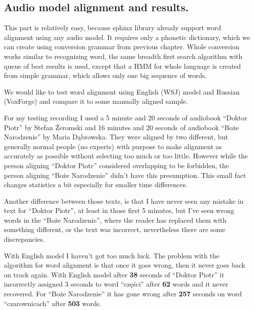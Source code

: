 \documentclass[12pt,a4paper,english]{article}
\begin{document}
\newpage
\subsection{Audio model alignment and results.}

This part is relatively easy, because sphinx library already support word alignment using any audio model. It requires only a phonetic dictionary, which we can create using conversion grammar from previous chapter.  Whole conversion works similar to recognizing word, the same breadth first search algorithm with queue of best results is used, except that a HMM for whole language is created from simple grammar, which allows only one big sequence of words. \newline

We would like to test word alignment using English (WSJ) model and Russian (VoxForge) and compare it to some manually aligned sample. \newline

For my testing recording I used a 5 minute and 20 seconds of audiobook “Doktor Piotr” by Stefan Żeromski and 16 minutes and 20 seconds of audiobook “Boże Narodzenie” by Maria Dąbrowska. \newline
They were aligned by two different, but generally normal people (no experts) with purpose to make alignment as accurately as possible without selecting too much or too little. However while the person aligning “Doktor Piotr” considered overlapping to be forbidden, the person aligning “Boże Narodzenie” didn't have this presumption. This small fact changes statistics a bit especially for smaller time differences. \newline

Another difference between those texts, is that I have never seen any mistake in text for “Doktor Piotr”, at least in those first 5 minutes, but I've seen wrong words in the “Boże Narodzenie”, where the reader has replaced them with something different, or the text was incorrect, nevertheless there are some discrepancies. \newline

\newpage

With English model I haven't got too much luck. The problem with the algorithm for word alignment is that once it goes wrong, then it never goes back on track again. With English model after \textbf{38} seconds of “Doktor Piotr” it incorrectly assigned 3 seconds to word “części” after \textbf{62} words and it never recovered. For “Boże Narodzenie” it has gone wrong after \textbf{257} seconds on word “czarownicach” after \textbf{503} words. \newline
\end{document}
